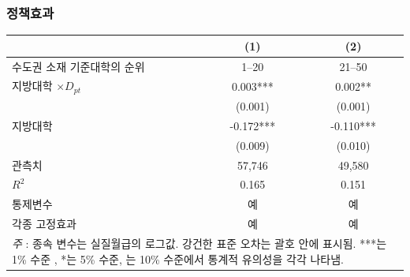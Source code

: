 \documentclass[aspectratio=169,xcolor=dvipsnames,handout]{beamer}
\begin{document}
\begin{frame}
    \frametitle{정책효과}
    \begin{table}[ht]
        \tiny
        \centering
        \begin{tabular}{lcc}
        \toprule
        & \textbf{(1)} & \textbf{(2)} \\
        \midrule
        수도권 소재 기준대학의 순위 & 1--20     & 21--50  \\
        \midrule                                                                                  
        지방대학 $\times D_{pt}$      & 0.003***  & 0.002**   \\
                                                  & (0.001)   & (0.001)   \\
        지방대학                      & -0.172*** & -0.110*** \\
                                                  & (0.009)   & (0.010)   \\
        \midrule                                                          
        관측치                              & 57,746    & 49,580    \\
        $R^2$                                 & 0.165     & 0.151     \\
        통제변수                                  & 예       & 예       \\
        각종 고정효과                                       & 예       & 예       \\
        \bottomrule
        \multicolumn{3}{p{6cm}}{\tiny\textit{주} : 종속 변수는 실질월급의 로그값. 강건한 표준 오차는 괄호 안에 표시됨. ***는 1\% 수준 , *는 5\% 수준, 는 10\% 수준에서 통계적 유의성을 각각 나타냄.} \\
        \end{tabular}
    \end{table}
\end{frame}
\end{document}
